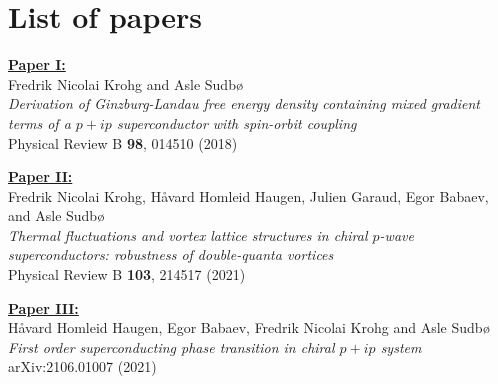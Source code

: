 \chapter*{List of papers}
%
\vspace{.3cm}

\noindent\textbf{\hyperref[pap:I]{Paper I:}}\\
Fredrik Nicolai Krohg and Asle Sudb{\o}\\
\textit{Derivation of Ginzburg-Landau free energy density containing mixed gradient terms of a $p+ip$ superconductor with spin-orbit coupling}\\
Physical Review B \textbf{98}, 014510 (2018) \hspace{.5cm}\cite{Krohg18}
\vspace{1cm}

\noindent\textbf{\hyperref[pap:II]{Paper II:}}\\
Fredrik Nicolai Krohg, Håvard Homleid Haugen, Julien Garaud, Egor Babaev, and Asle Sudb{\o}\\
\textit{Thermal fluctuations and vortex lattice structures in chiral $p$-wave superconductors: robustness of double-quanta vortices}\\
Physical Review B \textbf{103}, 214517 (2021) \hspace{.5cm}\cite{Krohg20}
\vspace{1cm}

\noindent\textbf{\hyperref[pap:III]{Paper III:}}\\
Håvard Homleid Haugen, Egor Babaev, Fredrik Nicolai Krohg and Asle Sudb{\o}\\
\textit{First order superconducting phase transition in chiral $p+ip$ system}\\
arXiv:2106.01007 (2021) \hspace{.5cm}\cite{Haugen21}

